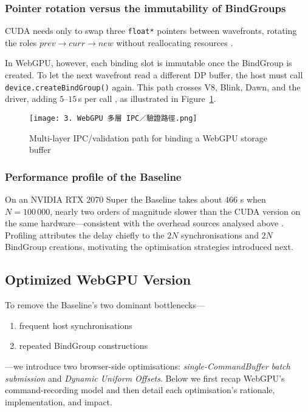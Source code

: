 \documentclass[PhD]{PHlab-thesis}
\begin{document}
\subsubsection{Pointer rotation versus the immutability of BindGroups}
CUDA needs only to swap three \texttt{float*} pointers between wavefronts, rotating the roles $\textit{prev}\!\rightarrow\!\textit{curr}\!\rightarrow\!\textit{new}$ without reallocating resources \cite{NVIDIA2023-cudaguide}.

In WebGPU, however, each binding slot is immutable once the BindGroup is created. To let the next wavefront read a different DP buffer, the host must call \texttt{device.createBindGroup()} again. This path crosses V8, Blink, Dawn, and the driver, adding $5$–$15$\,\textmu s per call \cite{Chrome2024-blog}, as illustrated in Figure~\ref{fig:webgpu-ipc-validation}.

\begin{figure}[htbp]
    \centering
    \texttt{[image: 3. WebGPU 多層 IPC／驗證路徑.png]}
    \caption{Multi-layer IPC/validation path for binding a WebGPU storage buffer}
    \label{fig:webgpu-ipc-validation}
\end{figure}

\subsubsection{Performance profile of the Baseline}
On an NVIDIA RTX 2070 Super the Baseline takes about $466$ s when $N=100\,000$, nearly two orders of magnitude slower than the CUDA version on the same hardware—consistent with the overhead sources analysed above \cite{Chrome2024-blog}. Profiling attributes the delay chiefly to the $2N$ synchronisations and $2N$ BindGroup creations, motivating the optimisation strategies introduced next.





\subsection{Optimized WebGPU Version}

To remove the Baseline's two dominant bottlenecks—
\begin{enumerate}
  \item frequent host synchronisations
  \item repeated BindGroup constructions
\end{enumerate}
—we introduce two browser-side optimisations: \emph{single-CommandBuffer batch submission} and \emph{Dynamic Uniform Offsets}. Below we first recap WebGPU's command-recording model \cite{W3C2024-webgpu} and then detail each optimisation's rationale, implementation, and impact.
\end{document}
